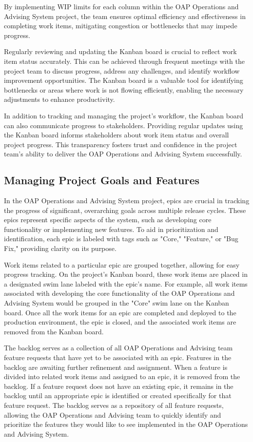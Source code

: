 \documentclass[12pt]{article}
\begin{document}
By implementing WIP limits for each column within the OAP Operations and Advising System project, the team ensures optimal efficiency and effectiveness in completing work items, mitigating congestion or bottlenecks that may impede progress.

Regularly reviewing and updating the Kanban board is crucial to reflect work item status accurately. This can be achieved through frequent meetings with the project team to discuss progress, address any challenges, and identify workflow improvement opportunities. The Kanban board is a valuable tool for identifying bottlenecks or areas where work is not flowing efficiently, enabling the necessary adjustments to enhance productivity.

In addition to tracking and managing the project's workflow, the Kanban board can also communicate progress to stakeholders. Providing regular updates using the Kanban board informs stakeholders about work item status and overall project progress. This transparency fosters trust and confidence in the project team's ability to deliver the OAP Operations and Advising System successfully.

\subsection{Managing Project Goals and Features} 
In the OAP Operations and Advising System project, epics are crucial in tracking the progress of significant, overarching goals across multiple release cycles. These epics represent specific aspects of the system, such as developing core functionality or implementing new features. To aid in prioritization and identification, each epic is labeled with tags such as "Core," "Feature," or "Bug Fix," providing clarity on its purpose.

Work items related to a particular epic are grouped together, allowing for easy progress tracking. On the project's Kanban board, these work items are placed in a designated swim lane labeled with the epic's name. For example, all work items associated with developing the core functionality of the OAP Operations and Advising System would be grouped in the "Core" swim lane on the Kanban board. Once all the work items for an epic are completed and deployed to the production environment, the epic is closed, and the associated work items are removed from the Kanban board.

The backlog serves as a collection of all OAP Operations and Advising team feature requests that have yet to be associated with an epic. Features in the backlog are awaiting further refinement and assignment. When a feature is divided into related work items and assigned to an epic, it is removed from the backlog. If a feature request does not have an existing epic, it remains in the backlog until an appropriate epic is identified or created specifically for that feature request. The backlog serves as a repository of all feature requests, allowing the OAP Operations and Advising team to quickly identify and prioritize the features they would like to see implemented in the OAP Operations and Advising System.
\end{document}
